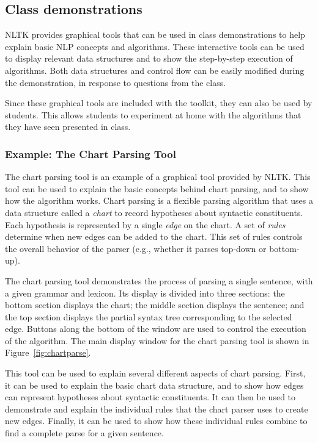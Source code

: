 \documentclass[11pt]{article}
\begin{document}
\subsection{Class demonstrations}

NLTK provides graphical tools that can be used in class demonstrations
to help explain basic NLP concepts and algorithms.  These interactive
tools can be used to display relevant data structures and to show the
step-by-step execution of algorithms.  Both data structures and
control flow can be easily modified during the demonstration, in
response to questions from the class.

Since these graphical tools are included with the toolkit, they can
also be used by students.  This allows students to experiment at home
with the algorithms that they have seen presented in class.

\subsubsection*{Example: The Chart Parsing Tool}

The chart parsing tool is an example of a graphical tool provided by
NLTK.  This tool can be used to explain the basic concepts behind
chart parsing, and to show how the algorithm works.  Chart parsing is
a flexible parsing algorithm that uses a data structure called a
\emph{chart} to record hypotheses about syntactic constituents.  Each
hypothesis is represented by a single \emph{edge} on the chart.  A set
of \emph{rules} determine when new edges can be added to the chart.
This set of rules controls the overall behavior of the parser (e.g.,
whether it parses top-down or bottom-up).

The chart parsing tool demonstrates the process of parsing a single
sentence, with a given grammar and lexicon.  Its display is divided
into three sections: the bottom section displays the chart; the middle
section displays the sentence; and the top section displays the
partial syntax tree corresponding to the selected edge.  Buttons along
the bottom of the window are used to control the execution of the
algorithm.  The main display window for the chart parsing tool is
shown in Figure~\ref{fig:chartparse}.   

This tool can be used to explain several different aspects of chart
parsing.  First, it can be used to explain the basic chart data
structure, and to show how edges can represent hypotheses about
syntactic constituents.  It can then be used to demonstrate and
explain the individual rules that the chart parser uses to create new
edges.  Finally, it can be used to show how these individual rules
combine to find a complete parse for a given sentence.
\end{document}
